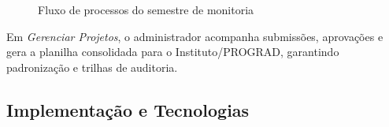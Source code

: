 \documentclass[portuguese]{sbc2025}%
\begin{document}
\begin{figure}[h!]
  \centering
  \caption{Fluxo de processos do semestre de monitoria}
  \label{fig:process-flow}
\end{figure}

Em \textit{Gerenciar Projetos}, o administrador acompanha submissões, aprovações e gera a planilha consolidada para o Instituto/PROGRAD, garantindo padronização e trilhas de auditoria.

\subsection{Implementação e Tecnologias}
\end{document}
